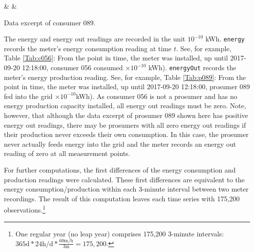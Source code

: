 \begin{table}[htbp]
    {\csvcolii & \csvcoliii & \csvcoliv}%
    \caption[Data excerpt of prosumer 089]{Data excerpt of consumer 089. \quantnet}
    \label{Tab:p089}
\end{table}

The energy and energy out readings are recorded in the unit $10^{-10}$ kWh. \texttt{energy} records the meter's energy consumption reading at time $t$. See, for example, Table \ref{Tab:c056}: From the point in time, the meter was installed, up until 2017-09-20 12:18:00, consumer 056 consumed %
{\csvcoliii}$\times 10^{-10}$ kWh). \texttt{energyOut} records the meter's energy production reading. See, for example, Table \ref{Tab:p089}: From the point in time, the meter was installed, up until 2017-09-20 12:18:00, prosumer 089 fed into the grid %
{\csvcoliii}$\times 10^{-10}$kWh). As consumer 056 is not a prosumer and has no energy production capacity installed, all energy out readings must be zero. Note, however, that although the data excerpt of prosumer 089 shown here has positive energy out readings, there may be prosumers with all zero energy out readings if their production never exceeds their own consumption. In this case, the prosumer never actually feeds energy into the grid and the meter records an energy out reading of zero at all measurement points.

For further computations, the first differences of the energy consumption and production readings were calculated. These first differences are equivalent to the energy consumption/production within each 3-minute interval between two meter recordings. The result of this computation leaves each time series with 175,200 observations.\footnote{One regular year (no leap year) comprises 175,200 3-minute intervals: $365\text{d} * 24\text{h/d} * \frac{60\text{m/h}}{3\text{m}} = 175,200$.}



